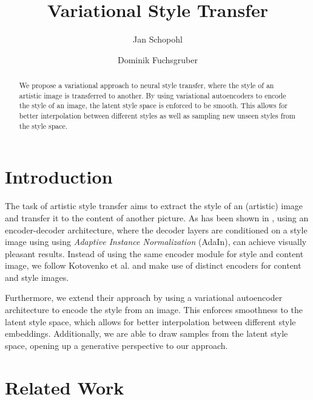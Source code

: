 \documentclass[10pt,twocolumn,letterpaper]{article}
\begin{document}
\title{Variational Style Transfer}

\author{
Jan Schopohl
\and
Dominik Fuchsgruber
}

\maketitle

\begin{abstract}
   We propose a variational approach to neural style transfer, where the style of an artistic image is transferred to another. By using variational autoencoders to encode the style of an image, the latent style space is enforced to be smooth. This allows for better interpolation between different styles as well as sampling new unseen styles from the style space.
\end{abstract}

\section{Introduction}

The task of artistic style transfer aims to extract the style of an (artistic) image and transfer it to the content of another picture. As has been shown in \cite{adain}, using an encoder-decoder architecture, where the decoder layers are conditioned on a style image using using \textit{Adaptive Instance Normalization} (AdaIn), can achieve visually pleasant results. Instead of using the same encoder module for style and content image, we follow Kotovenko et al. \cite{disentanglement} and make use of distinct encoders for content and style images.

Furthermore, we extend their approach by using a variational autoencoder architecture \cite{vae} to encode the style from an image. This enforces smoothness to the latent style space, which allows for better interpolation between different style embeddings. Additionally, we are able to draw samples from the latent style space, opening up a generative perspective to our approach.

\section{Related Work}
\end{document}
